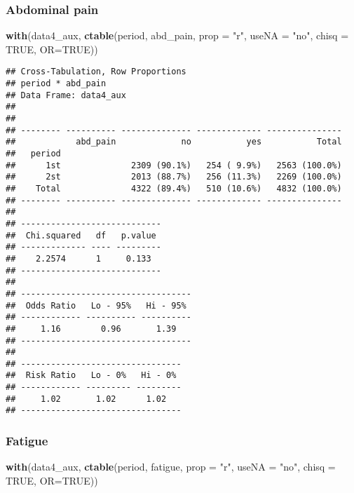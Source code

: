 \documentclass[
]{article}
\newenvironment{Shaded}{\begin{snugshade}}{\end{snugshade}}
\newcommand{\DataTypeTok}[1]{\textcolor[rgb]{0.13,0.29,0.53}{#1}}
\newcommand{\KeywordTok}[1]{\textcolor[rgb]{0.13,0.29,0.53}{\textbf{#1}}}
\newcommand{\NormalTok}[1]{#1}
\newcommand{\OtherTok}[1]{\textcolor[rgb]{0.56,0.35,0.01}{#1}}
\newcommand{\StringTok}[1]{\textcolor[rgb]{0.31,0.60,0.02}{#1}}
\begin{document}
\hypertarget{abdominal-pain-2}{%
\subsubsection{Abdominal pain}\label{abdominal-pain-2}}

\begin{Shaded}
\begin{Highlighting}[]
\KeywordTok{with}\NormalTok{(data4_aux, }\KeywordTok{ctable}\NormalTok{(period, abd_pain, }\DataTypeTok{prop =} \StringTok{"r"}\NormalTok{, }\DataTypeTok{useNA =} \StringTok{"no"}\NormalTok{, }\DataTypeTok{chisq =} \OtherTok{TRUE}\NormalTok{, }\DataTypeTok{OR=}\OtherTok{TRUE}\NormalTok{))}
\end{Highlighting}
\end{Shaded}

\begin{verbatim}
## Cross-Tabulation, Row Proportions  
## period * abd_pain  
## Data Frame: data4_aux  
## 
## 
## -------- ---------- -------------- ------------- ---------------
##            abd_pain             no           yes           Total
##   period                                                        
##      1st              2309 (90.1%)   254 ( 9.9%)   2563 (100.0%)
##      2st              2013 (88.7%)   256 (11.3%)   2269 (100.0%)
##    Total              4322 (89.4%)   510 (10.6%)   4832 (100.0%)
## -------- ---------- -------------- ------------- ---------------
## 
## ----------------------------
##  Chi.squared   df   p.value 
## ------------- ---- ---------
##    2.2574      1     0.133  
## ----------------------------
## 
## ----------------------------------
##  Odds Ratio   Lo - 95%   Hi - 95% 
## ------------ ---------- ----------
##     1.16        0.96       1.39   
## ----------------------------------
## 
## --------------------------------
##  Risk Ratio   Lo - 0%   Hi - 0% 
## ------------ --------- ---------
##     1.02       1.02      1.02   
## --------------------------------
\end{verbatim}

\hypertarget{fatigue-2}{%
\subsubsection{Fatigue}\label{fatigue-2}}

\begin{Shaded}
\begin{Highlighting}[]
\KeywordTok{with}\NormalTok{(data4_aux, }\KeywordTok{ctable}\NormalTok{(period, fatigue, }\DataTypeTok{prop =} \StringTok{"r"}\NormalTok{, }\DataTypeTok{useNA =} \StringTok{"no"}\NormalTok{, }\DataTypeTok{chisq =} \OtherTok{TRUE}\NormalTok{, }\DataTypeTok{OR=}\OtherTok{TRUE}\NormalTok{))}
\end{Highlighting}
\end{Shaded}
\end{document}
